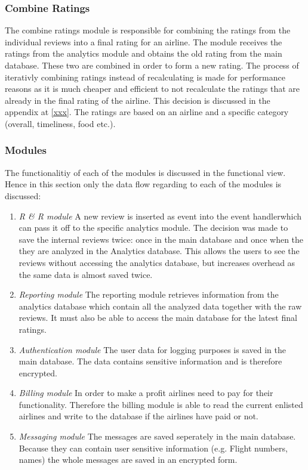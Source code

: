 \subsubsection{Combine Ratings}

The combine ratings module is responsible for combining the ratings from the individual reviews into a final rating for an airline. The module receives the ratings from the analytics module and obtains the old rating from the main database. These two are combined in order to form a new rating. The process of iterativly combining ratings instead of recalculating is made for performance reasons as it is much cheaper and efficient to not recalculate the ratings that are already in the final rating of the airline. This decision is discussed in the appendix at \ref{xxx}. The ratings are based on an airline and a specific category (overall, timeliness, food etc.).

\subsubsection{Modules}
The functionalitiy of each of the modules is discussed in the functional view. Hence in this section only the data flow regarding to each of the modules is discussed:

\begin{enumerate}
\item \emph{R & R module} A new review is inserted as event into the event handlerwhich can pass it off to the specific analytics module. The decision was made to save the internal reviews twice: once in the main database and once when the they are analyzed in the Analytics database. This allows the users to see the reviews without accessing the analytics database, but increases overhead as the same data is almost saved twice.
\item \emph{Reporting module} The reporting module retrieves information from the analytics database which contain all the analyzed data together with the raw reviews. It must also be able to access the main database for the latest final ratings.
\item \emph{Authentication module} The user data for logging purposes is saved in the main database. The data contains sensitive information and is therefore encrypted.
\item \emph{Billing module} In order to make a profit airlines need to pay for their functionality. Therefore the billing module is able to read the current enlisted airlines and write to the database if the airlines have paid or not.
\item \emph{Messaging module} The messages are saved seperately in the main database. Because they can contain user sensitive information (e.g. Flight numbers, names) the whole messages are saved in an encrypted form. 
\end{enumerate}
